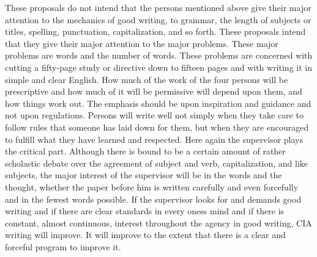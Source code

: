 \documentclass[
    oneside,
    11pt,
]{memoir}
\begin{document}
These proposals do not intend that the persons mentioned above give their major attention to the mechanics of good writing, to grammar, the length of subjects or titles, spelling, punctuation, capitalization, and so forth. These proposals intend that they give their major attention to the major problems. These major problems are words and the number of words. These problems are concerned with cutting a fifty-page study or directive down to fifteen pages and with writing it in simple and clear English. How much of the work of the four persons will be prescriptive and how much of it will be permissive will depend upon them, and how things work out. The emphasis should be upon inspiration and guidance and not upon regulations. Persons will write well not simply when they take care to follow rules that someone has laid down for them, but when they are encouraged to fulfill what they have learned and respected. Here again the supervisor plays the critical part. Although there is bound to be a certain amount of rather scholastic debate over the agreement of subject and verb, capitalization, and like subjects, the major interest of the supervisor will be in the words and the thought, whether the paper before him is written carefully and even forcefully and in the fewest words possible. If the supervisor looks for and demands good writing and if there are clear standards in every oness mind and if there is constant, almost continuous, interest throughout the agency in good writing, CIA writing will improve. It will improve to the extent that there is a clear and forceful program to improve it.
\backmatter{}
\newpage
\thispagestyle{empty}
\
\end{document}
